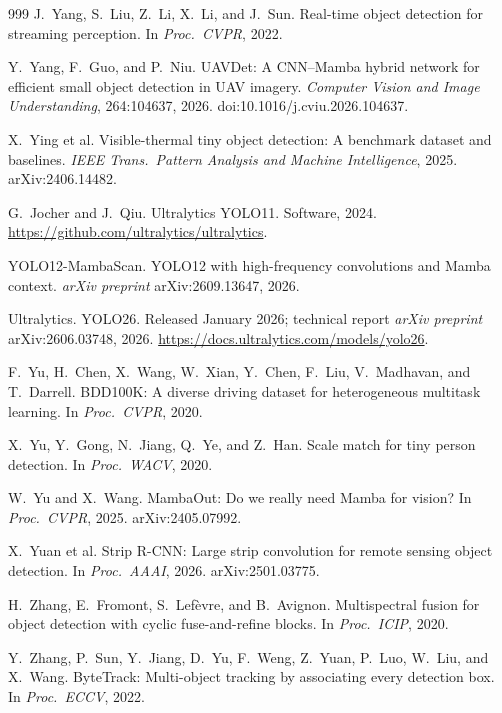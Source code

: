 \begin{thebibliography}{999}
J.~Yang, S.~Liu, Z.~Li, X.~Li, and J.~Sun.
Real-time object detection for streaming perception.
In \textit{Proc.\ CVPR}, 2022.

Y.~Yang, F.~Guo, and P.~Niu.
UAVDet: A CNN--Mamba hybrid network for efficient small object detection in
UAV imagery. \textit{Computer Vision and Image Understanding}, 264:104637,
2026. doi:10.1016/j.cviu.2026.104637.

X.~Ying et al.
Visible-thermal tiny object detection: A benchmark dataset and baselines.
\textit{IEEE Trans.\ Pattern Analysis and Machine Intelligence}, 2025.
arXiv:2406.14482.

G.~Jocher and J.~Qiu.
Ultralytics YOLO11. Software, 2024.
\url{https://github.com/ultralytics/ultralytics}.

YOLO12-MambaScan. YOLO12 with high-frequency convolutions and Mamba context.
\textit{arXiv preprint} arXiv:2609.13647, 2026.

Ultralytics.
YOLO26. Released January 2026; technical report \textit{arXiv preprint}
arXiv:2606.03748, 2026. \url{https://docs.ultralytics.com/models/yolo26}.

F.~Yu, H.~Chen, X.~Wang, W.~Xian, Y.~Chen, F.~Liu, V.~Madhavan, and T.~Darrell.
BDD100K: A diverse driving dataset for heterogeneous multitask learning.
In \textit{Proc.\ CVPR}, 2020.

X.~Yu, Y.~Gong, N.~Jiang, Q.~Ye, and Z.~Han.
Scale match for tiny person detection.
In \textit{Proc.\ WACV}, 2020.

W.~Yu and X.~Wang.
MambaOut: Do we really need Mamba for vision?
In \textit{Proc.\ CVPR}, 2025. arXiv:2405.07992.

X.~Yuan et al.
Strip R-CNN: Large strip convolution for remote sensing object detection.
In \textit{Proc.\ AAAI}, 2026. arXiv:2501.03775.

H.~Zhang, E.~Fromont, S.~Lef\`evre, and B.~Avignon.
Multispectral fusion for object detection with cyclic fuse-and-refine blocks.
In \textit{Proc.\ ICIP}, 2020.

Y.~Zhang, P.~Sun, Y.~Jiang, D.~Yu, F.~Weng, Z.~Yuan, P.~Luo, W.~Liu, and X.~Wang.
ByteTrack: Multi-object tracking by associating every detection box.
In \textit{Proc.\ ECCV}, 2022.


\end{thebibliography}
